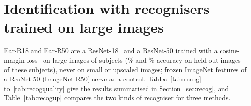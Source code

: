 \begin{table}[H]
\centering
\caption{Difference between training with the measured degradation and with fixed JPEG~75, same backbone, by test input (PSNR-Y, dB; 95\% confidence intervals). The row SPAN-S, Measured is the comparison with fine-tuned JPEG~75 in Table~\ref{tab:main}.}
\label{tab:levels}
\end{table}

\begin{table}[H]
\centering
\caption{Difference between SPAN fine-tuned with the measured degradation and two JPEG-only variants (PSNR-Y, dB; 95\% confidence intervals).}
\label{tab:ablation}
\end{table}

\section{Identification with recognisers trained on large images}
\label{app:recoglarge}
Ear-R18 and Ear-R50 are a ResNet-18~\cite{he2016resnet} and a ResNet-50 trained with a cosine-margin loss~\cite{wang2018cosface} on large images of \RecTrainSubj{} subjects (\RecValAcc{}\% and \RecRfValAcc{}\% accuracy on held-out images of these subjects), never on small or upscaled images; frozen ImageNet features of a ResNet-50 (ImageNet-R50) serve as a control. Tables~\ref{tab:recog} to~\ref{tab:recogquality} give the results summarised in Section~\ref{sec:recog}, and Table~\ref{tab:recogup} compares the two kinds of recogniser for three methods.

\begin{table}[H]
\centering
\caption{Identification of real small ear images (short side 24 to 48 pixels) after $\times4$ upscaling. Rank-1 rate with 95\% confidence interval and equal error rate, in \%, for the ear recogniser Ear-R18 and for the frozen ImageNet features ImageNet-R50. Fine-tuned rows average the models of the folds.}
\label{tab:recog}
\end{table}


